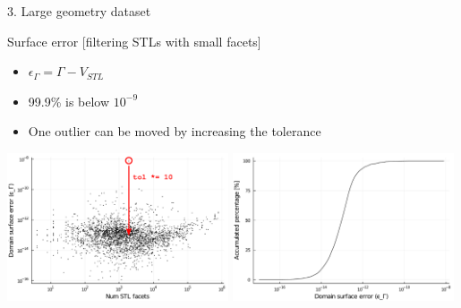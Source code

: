 \documentclass{beamer}
\begin{document}
\begin{frame}{3. Large geometry dataset}

  \begin{block}{Surface error [filtering STLs with small facets]}
  \begin{itemize}
    \item
      $\epsilon_\Gamma = \Gamma - V_{STL}$
    \item
      99.9\% is below $10^{-9}$
    \item
      One outlier can be moved by increasing the tolerance
  \end{itemize}
  \end{block}

  \includegraphics[width=0.49\textwidth]{moving_filter_num_stl_facets_surface_error}
  \includegraphics[width=0.49\textwidth]{../analysis/plots/filter_histogram_surface_error}
\end{frame}
\end{document}
